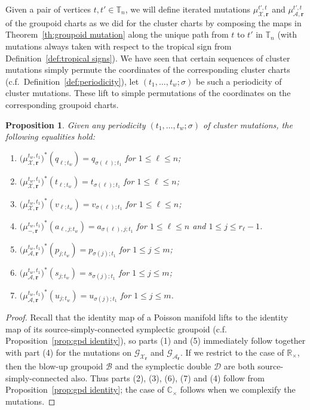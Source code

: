 \documentclass{amsart}
\newtheorem{proposition}[theorem]{Proposition}
\numberwithin{equation}{section}
\newcommand{\bfr}{{\boldsymbol{r}}}
\newcommand{\cA}{\mathcal{A}}
\newcommand{\cB}{\mathcal{B}}
\newcommand{\cD}{\mathcal{D}}
\newcommand{\cG}{\mathcal{G}}
\newcommand{\cX}{\mathcal{X}}
\newcommand{\CC}{\mathbb{C}}
\newcommand{\RR}{\mathbb{R}}
\newcommand{\TT}{\mathbb{T}}
\begin{document}
Given a pair of vertices $t,t'\in\TT_n$, we will define iterated mutations $\mu_{\cX,\bfr}^{t',t}$ and $\mu_{\cA,\bfr}^{t',t}$ of the groupoid charts as we did for the cluster charts by composing the maps in Theorem~\ref{th:groupoid mutation} along the unique path from $t$ to $t'$ in $\TT_n$ (with mutations always taken with respect to the tropical sign from Definition~\ref{def:tropical signs}).
We have seen that certain sequences of cluster mutations simply permute the coordinates of the corresponding cluster charts (c.f.\ Definition~\ref{def:periodicity}), let $(t_1,\ldots,t_w;\sigma)$ be such a periodicity of cluster mutations.
These lift to simple permutations of the coordinates on the corresponding groupoid charts.
\begin{proposition}
  \label{prop:gpd periodicity}
  Given any periodicity $(t_1,\ldots,t_w;\sigma)$ of cluster mutations, the following equalities hold:
  \begin{enumerate}
    \item $\big(\mu_{\cX,\bfr}^{t_w,t_1}\big)^*(q_{\ell;t_w})=q_{\sigma(\ell);t_1}$ for $1\le\ell\le n$;
    \item $\big(\mu_{\cX,\bfr}^{t_w,t_1}\big)^*(t_{\ell;t_w})=t_{\sigma(\ell);t_1}$ for $1\le\ell\le n$;
    \item $\big(\mu_{\cX,\bfr}^{t_w,t_1}\big)^*(v_{\ell;t_w})=v_{\sigma(\ell);t_1}$ for $1\le\ell\le n$;
    \item $\big(\mu_{-,\bfr}^{t_w,t_1}\big)^*(a_{\ell,j;t_w})=a_{\sigma(\ell),j;t_1}$ for $1\le\ell\le n$ and $1\le j\le r_\ell-1$.
    \item $\big(\mu_{\cA,\bfr}^{t_w,t_1}\big)^*(p_{j;t_w})=p_{\sigma(j);t_1}$ for $1\le j\le m$;
    \item $\big(\mu_{\cA,\bfr}^{t_w,t_1}\big)^*(s_{j;t_w})=s_{\sigma(j);t_1}$ for $1\le j\le m$;
    \item $\big(\mu_{\cA,\bfr}^{t_w,t_1}\big)^*(u_{j;t_w})=u_{\sigma(j);t_1}$ for $1\le j\le m$.
  \end{enumerate}
\end{proposition}
\begin{proof}
  Recall that the identity map of a Poisson manifold lifts to the identity map of its source-simply-connected symplectic groupoid (c.f. Proposition~\ref{prop:gpd identity}), so parts (1) and (5) immediately follow together with part (4) for the mutations on $\cG_{\cX_\bfr}$ and $\cG_{\cA_\bfr}$.
  If we restrict to the case of $\RR_\times$, then the blow-up groupoid $\cB$ and the symplectic double $\cD$ are both source-simply-connected also.
  Thus parts (2), (3), (6), (7) and (4) follow from Proposition~\ref{prop:gpd identity}; the case of $\CC_\times$ follows when we complexify the mutations. 
\end{proof}
\end{document}
